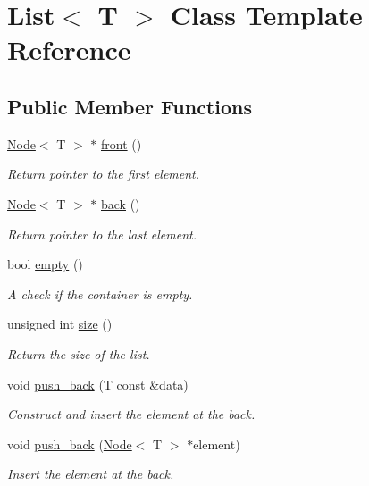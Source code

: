 \hypertarget{classList}{}\section{List$<$ T $>$ Class Template Reference}
\label{classList}
\subsection*{Public Member Functions}
\begin{DoxyCompactItemize}
\item 
\hyperlink{structNode}{Node}$<$ T $>$ $\ast$ \hyperlink{classList_a0ea52d2f31cba662a5121ba724a1afc6}{front} ()
\begin{DoxyCompactList}\small\item\em Return pointer to the first element. \end{DoxyCompactList}\item 
\hyperlink{structNode}{Node}$<$ T $>$ $\ast$ \hyperlink{classList_a0e0849a1ca10791cb2788ec41af14c26}{back} ()
\begin{DoxyCompactList}\small\item\em Return pointer to the last element. \end{DoxyCompactList}\item 
bool \hyperlink{classList_a3737ca60365287ce663393d8c07d1a41}{empty} ()
\begin{DoxyCompactList}\small\item\em A check if the container is empty. \end{DoxyCompactList}\item 
unsigned int \hyperlink{classList_ad908ab5cf19370fcdf61cf1927e5e8f5}{size} ()
\begin{DoxyCompactList}\small\item\em Return the size of the list. \end{DoxyCompactList}\item 
void \hyperlink{classList_afc370c46b52217d24992076d66e78c2e}{push\+\_\+back} (T const \&data)
\begin{DoxyCompactList}\small\item\em Construct and insert the element at the back. \end{DoxyCompactList}\item 
void \hyperlink{classList_a36d7022ab9a7fadeb45a5933e64e8bd8}{push\+\_\+back} (\hyperlink{structNode}{Node}$<$ T $>$ $\ast$element)
\begin{DoxyCompactList}\small\item\em Insert the element at the back. \end{DoxyCompactList}\item 

\end{DoxyCompactItemize}
